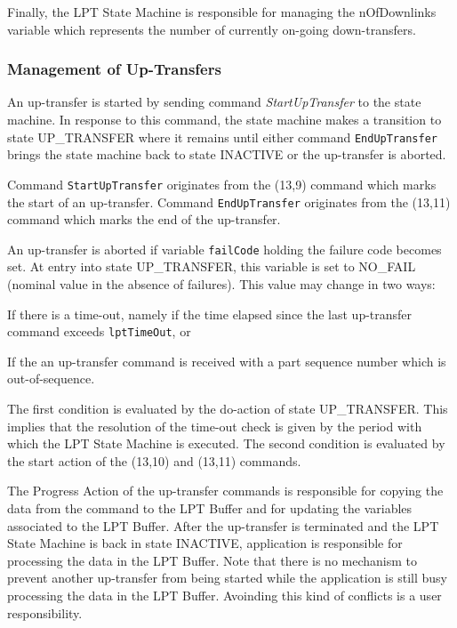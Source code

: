 \documentclass{pnp_article}
\begin{document}
Finally, the LPT State Machine is responsible for managing the nOfDownlinks variable which represents the number of currently on-going down-transfers.

\subsubsection{Management of Up-Transfers}
An up-transfer is started by sending command \textit{StartUpTransfer} to the state machine. In response to this command, the state machine makes a transition to state UP\_TRANSFER where it remains until either command \texttt{EndUpTransfer} brings the state machine back to state INACTIVE or the up-transfer is aborted. 

Command \texttt{StartUpTransfer} originates from the (13,9) command which marks the start of an up-transfer. Command \texttt{EndUpTransfer} originates from the (13,11) command which marks the end of the up-transfer.

An up-transfer is aborted if variable \texttt{failCode} holding the failure code becomes set. At entry into state UP\_TRANSFER, this variable is set to NO\_FAIL (nominal value in the absence of failures). This value may change in two ways:

\begin{fw_itemize}
\item If there is a time-out, namely if the time elapsed since the last up-transfer command exceeds \texttt{lptTimeOut}, or
\item If the an up-transfer command is received with a part sequence number which is out-of-sequence.
\end{fw_itemize}

The first condition is evaluated by the do-action of state UP\_TRANSFER. This implies that the resolution of the time-out check is given by the period with which the LPT State Machine is executed. The second condition is evaluated by the start action of the (13,10) and (13,11) commands.

The Progress Action of the up-transfer commands is responsible for copying the data from the command to the LPT Buffer and for updating the variables associated to the LPT Buffer. After the up-transfer is terminated and the LPT State Machine is back in state INACTIVE, application is responsible for processing the data in the LPT Buffer. Note that there is no mechanism to prevent another up-transfer from being started while the application is still busy processing the data in the LPT Buffer. Avoinding this kind of conflicts is a user responsibility.
\end{document}
